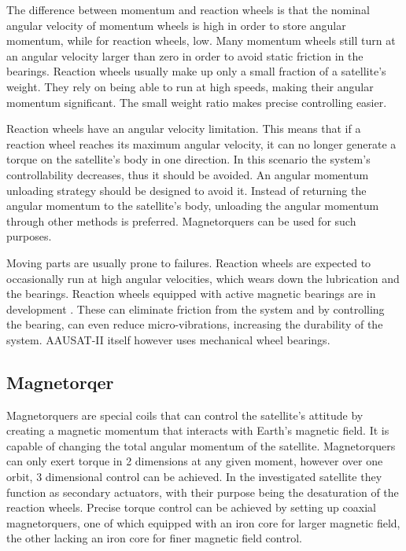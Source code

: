 The difference between momentum and reaction wheels is that the nominal angular velocity of momentum wheels is high in order to store angular momentum, while for reaction wheels, low. Many momentum wheels still turn at an angular velocity larger than zero in order to avoid static friction in the bearings. Reaction wheels usually make up only a small fraction of a satellite's weight. They rely on being able to run at high speeds, making their angular momentum significant. The small weight ratio makes precise controlling easier.




Reaction wheels have an angular velocity limitation. This means that if a reaction wheel reaches its maximum angular velocity, it can no longer generate a torque on the satellite's body in one direction. In this scenario the system's controllability decreases, thus it should be avoided. An angular momentum unloading strategy should be designed to avoid it. Instead of returning the angular momentum to the satellite's body, unloading the angular momentum through other methods is preferred. Magnetorquers can be used for such purposes.

Moving parts are usually prone to failures. Reaction wheels are expected to occasionally run at high angular velocities, which wears down the lubrication and the bearings. Reaction wheels equipped with active magnetic bearings are in development \cite{MagneticReactWheel}. These can eliminate friction from the system and by controlling the bearing, can even reduce micro-vibrations, increasing the durability of the system. AAUSAT-II itself however uses mechanical wheel bearings.



\subsection{Magnetorqer}

Magnetorquers are special coils that can control the satellite's attitude by creating a magnetic momentum that interacts with Earth's magnetic field. It is capable of changing the total angular momentum of the satellite. Magnetorquers can only exert torque in 2 dimensions at any given moment, however over one orbit, 3 dimensional control can be achieved. In the investigated satellite they function as secondary actuators, with their purpose being the desaturation of the reaction wheels. Precise torque control can be achieved by setting up coaxial magnetorquers, one of which equipped with an iron core for larger magnetic field, the other lacking an iron core for finer magnetic field control.
